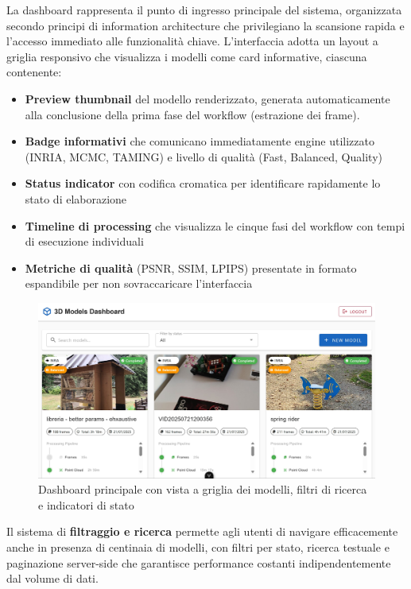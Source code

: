 La dashboard rappresenta il punto di ingresso principale del sistema, organizzata secondo principi di information architecture che privilegiano la scansione rapida e l'accesso immediato alle funzionalità chiave. L'interfaccia adotta un layout a griglia responsivo che visualizza i modelli come card informative, ciascuna contenente:

\begin{itemize}
	\item \textbf{Preview thumbnail} del modello renderizzato, generata automaticamente alla conclusione della prima fase del workflow (estrazione dei frame).
	\item \textbf{Badge informativi} che comunicano immediatamente engine utilizzato (INRIA, MCMC, TAMING) e livello di qualità (Fast, Balanced, Quality)
	\item \textbf{Status indicator} con codifica cromatica per identificare rapidamente lo stato di elaborazione
	\item \textbf{Timeline di processing} che visualizza le cinque fasi del workflow con tempi di esecuzione individuali
	\item \textbf{Metriche di qualità} (PSNR, SSIM, LPIPS) presentate in formato espandibile per non sovraccaricare l'interfaccia
\end{itemize}

\begin{figure}[htbp]
	\centering
	\includegraphics[width=\textwidth]{images/fronted_list.jpg}
	\caption{Dashboard principale con vista a griglia dei modelli, filtri di ricerca e indicatori di stato}
	\label{fig:dashboard_main}
\end{figure}

Il sistema di \textbf{filtraggio e ricerca} permette agli utenti di navigare efficacemente anche in presenza di centinaia di modelli, con filtri per stato, ricerca testuale e paginazione server-side che garantisce performance costanti indipendentemente dal volume di dati.

